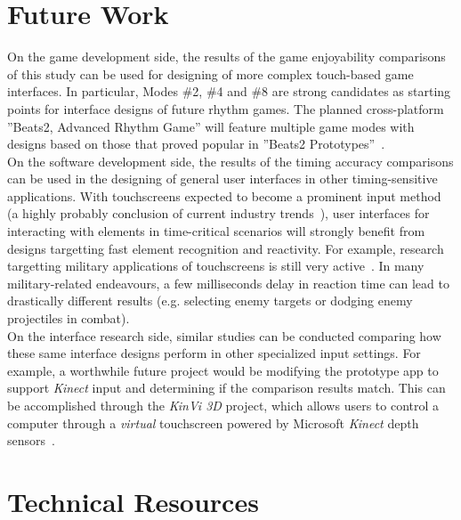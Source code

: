 \documentclass{sig-alternate}
\begin{document}
\section{Future Work}
\label{sec:future_work}

On the game development side, the results of the game enjoyability comparisons of this study can be used for designing of more complex touch-based game interfaces. In particular, Modes \#2, \#4 and \#8 are strong candidates as starting points for interface designs of future rhythm games. The planned cross-platform ''Beats2, Advanced Rhythm Game'' will feature multiple game modes with designs based on those that proved popular in ''Beats2 Prototypes''~\cite{beats_portable}.\\

On the software development side, the results of the timing accuracy comparisons can be used in the designing of general user interfaces in other timing-sensitive applications. With touchscreens expected to become a prominent input method (a highly probably conclusion of current industry trends~\cite{information_display}), user interfaces for interacting with elements in time-critical scenarios will strongly benefit from designs targetting fast element recognition and reactivity. For example, research targetting military applications of touchscreens is still very active~\cite{army_mil}. In many military-related endeavours, a few milliseconds delay in reaction time can lead to drastically different results (e.g. selecting enemy targets or dodging enemy projectiles in combat). \\

On the interface research side, similar studies can be conducted comparing how these same interface designs perform in other specialized input settings. For example, a worthwhile future project would be modifying the prototype app to support \textit{Kinect} input and determining if the comparison results match. This can be accomplished through the \textit{KinVi 3D} project, which allows users to control a computer through a \textit{virtual} touchscreen powered by Microsoft \textit{Kinect} depth sensors~\cite{kinvi3d}. \\

\section{Technical Resources}
\label{sec:resources}

\vspace{4pt}
\end{document}
